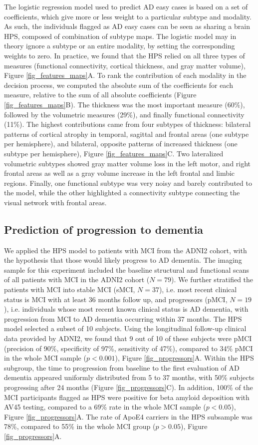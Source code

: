 \documentclass[authoryear]{elsarticle}
\begin{document}
The logistic regression model used to predict AD easy cases is based on a set of coefficients, which give more or less weight to a particular subtype and modality. As such, the individuals flagged as AD easy cases can be seen as sharing a brain HPS, composed of combination of subtype maps. The logistic model may in theory ignore a subtype or an entire modality, by setting the corresponding weights to zero. In practice, we found that the HPS relied on all three types of measures (functional connectivity, cortical thickness, and gray matter volume), Figure \ref{fig_features_maps}A. To rank the contribution of each modality in the decision process, we computed the absolute sum of the coefficients for each measure, relative to the sum of all absolute coefficients (Figure \ref{fig_features_maps}B). The thickness was the most important measure (60\%), followed by the volumetric measures (29\%), and finally functional connectivity (11\%). The highest contributions came from four subtypes of thickness: bilateral patterns of cortical atrophy in temporal, sagittal and frontal areas (one subtype per hemisphere), and bilateral, opposite patterns of increased thickness (one subtype per hemisphere), Figure \ref{fig_features_maps}C. Two lateralized volumetric subtypes showed gray matter volume loss in the left motor, and right frontal areas as well as a gray volume increase in the left frontal and limbic regions. Finally, one functional subtype was very noisy and barely contributed to the model, while the other highlighted a connectivity subtype connecting the visual network with frontal areas. 
\subsection*{Prediction of progression to dementia}
We applied the HPS model to patients with MCI from the ADNI2 cohort, with the hypothesis that those would likely progress to AD dementia. The imaging sample for this experiment included the baseline structural and functional scans of all patients with MCI  in the ADNI2 cohort ($N=79$). We further stratified the patients with MCI into stable MCI (sMCI, $N=37$), i.e. most recent clinical status is MCI with at least 36 months follow up, and progressors (pMCI, $N=19$), i.e. individuals whose most recent known clinical status is AD dementia, with progression from MCI to AD dementia occurring within 37 months. The HPS model selected a subset of 10 subjects. Using the longitudinal follow-up clinical data provided by ADNI2, we found that 9 out of 10 of these subjects were pMCI (precision of 90\%, specificity of 97\%, sensitivity of 47\%), compared to 34\% pMCI in the whole MCI sample ($p<0.001$), Figure \ref{fig_progressors}A. Within the HPS subgroup, the time to progression from baseline to the first evaluation of AD dementia appeared uniformly distributed from 5 to 37 months, with 50\% subjects progressing after 24 months (Figure \ref{fig_progressors}C). In addition, 100\% of the MCI participants flagged as HPS were positive for beta amyloid deposition with AV45 testing, compared to a 69\% rate in the whole MCI sample ($p<0.05$), Figure \ref{fig_progressors}A. The rate of ApoE4 carriers in the HPS subsample was 78\%, compared to 55\% in the whole MCI group ($p>0.05$), Figure \ref{fig_progressors}A. 
\end{document}
